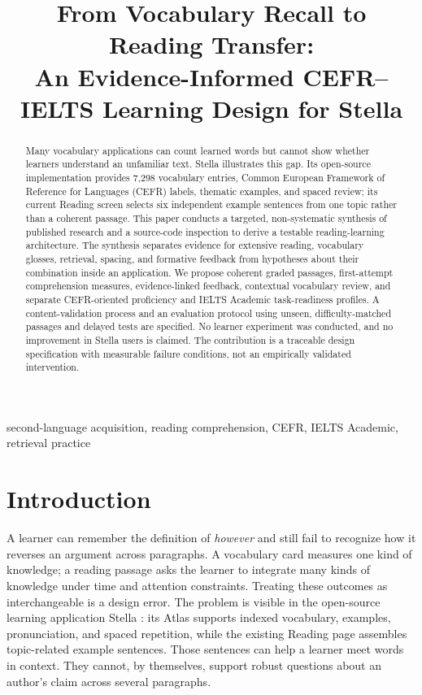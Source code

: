 \documentclass[conference,10pt]{IEEEtran}
\begin{document}
\title{From Vocabulary Recall to Reading Transfer:\\An Evidence-Informed CEFR--IELTS Learning Design for Stella}
\author{}
\maketitle
\begin{abstract}
Many vocabulary applications can count learned words but cannot show whether learners understand an unfamiliar text. Stella illustrates this gap. Its open-source implementation provides 7,298 vocabulary entries, Common European Framework of Reference for Languages (CEFR) labels, thematic examples, and spaced review; its current Reading screen selects six independent example sentences from one topic rather than a coherent passage. This paper conducts a targeted, non-systematic synthesis of published research and a source-code inspection to derive a testable reading-learning architecture. The synthesis separates evidence for extensive reading, vocabulary glosses, retrieval, spacing, and formative feedback from hypotheses about their combination inside an application. We propose coherent graded passages, first-attempt comprehension measures, evidence-linked feedback, contextual vocabulary review, and separate CEFR-oriented proficiency and IELTS Academic task-readiness profiles. A content-validation process and an evaluation protocol using unseen, difficulty-matched passages and delayed tests are specified. No learner experiment was conducted, and no improvement in Stella users is claimed. The contribution is a traceable design specification with measurable failure conditions, not an empirically validated intervention.
\end{abstract}
\begin{IEEEkeywords}
second-language acquisition, reading comprehension, CEFR, IELTS Academic, retrieval practice
\end{IEEEkeywords}

\section{Introduction}
A learner can remember the definition of \emph{however} and still fail to recognize how it reverses an argument across paragraphs. A vocabulary card measures one kind of knowledge; a reading passage asks the learner to integrate many kinds of knowledge under time and attention constraints. Treating these outcomes as interchangeable is a design error. The problem is visible in the open-source learning application Stella \cite{stellarepo}: its Atlas supports indexed vocabulary, examples, pronunciation, and spaced repetition, while the existing Reading page assembles topic-related example sentences. Those sentences can help a learner meet words in context. They cannot, by themselves, support robust questions about an author's claim across several paragraphs.
\end{document}
